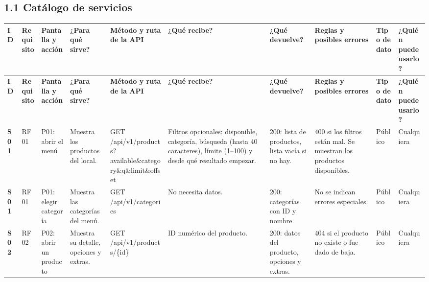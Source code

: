 \documentclass[10pt,letterpaper]{article}
\begin{document}
\begin{landscape}

\subsection*{1.1 Catálogo de servicios}
{\scriptsize
\begin{longtable}{|P{\tabcolsep\relax}|P{\tabcolsep\relax}|P{\tabcolsep\relax}|P{\tabcolsep\relax}|P{\tabcolsep\relax}|P{\tabcolsep\relax}|P{\tabcolsep\relax}|P{\tabcolsep\relax}|P{\tabcolsep\relax}|P{\tabcolsep\relax}|}
\hline
\textbf{ID} & \textbf{Requisito} & \textbf{Pantalla y acción} & \textbf{¿Para qué sirve?\allowbreak{}} & \textbf{Método y ruta de la API} & \textbf{¿Qué recibe?\allowbreak{}} & \textbf{¿Qué devuelve?\allowbreak{}} & \textbf{Reglas y posibles errores} & \textbf{Tipo de dato} & \textbf{¿Quién puede usarlo?\allowbreak{}} \\ \hline
\endfirsthead
\hline
\textbf{ID} & \textbf{Requisito} & \textbf{Pantalla y acción} & \textbf{¿Para qué sirve?\allowbreak{}} & \textbf{Método y ruta de la API} & \textbf{¿Qué recibe?\allowbreak{}} & \textbf{¿Qué devuelve?\allowbreak{}} & \textbf{Reglas y posibles errores} & \textbf{Tipo de dato} & \textbf{¿Quién puede usarlo?\allowbreak{}} \\ \hline
\endhead
\textbf{S01} & RF01 & P01: abrir el menú & Muestra los productos del local. & GET /\allowbreak{}api/\allowbreak{}v1/\allowbreak{}products?\allowbreak{}available\&\allowbreak{}category\&\allowbreak{}q\&\allowbreak{}limit\&\allowbreak{}offset & Filtros opcionales: disponible, categoría, búsqueda (hasta 40 caracteres), límite (1–100) y desde qué resultado empezar. & 200: lista de productos, lista vacía si no hay. & 400 si los filtros están mal. Se muestran los productos disponibles. & Público & Cualquiera \\ \hline
\textbf{S01} & RF01 & P01: elegir categoría & Muestra las categorías del menú. & GET /\allowbreak{}api/\allowbreak{}v1/\allowbreak{}categories & No necesita datos. & 200: categorías con ID y nombre. & No se indican errores especiales. & Público & Cualquiera \\ \hline
\textbf{S02} & RF02 & P02: abrir un producto & Muestra su detalle, opciones y extras. & GET /\allowbreak{}api/\allowbreak{}v1/\allowbreak{}products/\allowbreak{}\{id\} & ID numérico del producto. & 200: datos del producto, opciones y extras. & 404 si el producto no existe o fue dado de baja. & Público & Cualquiera \\ \hline

\end{longtable}}
\end{landscape}
\end{document}
